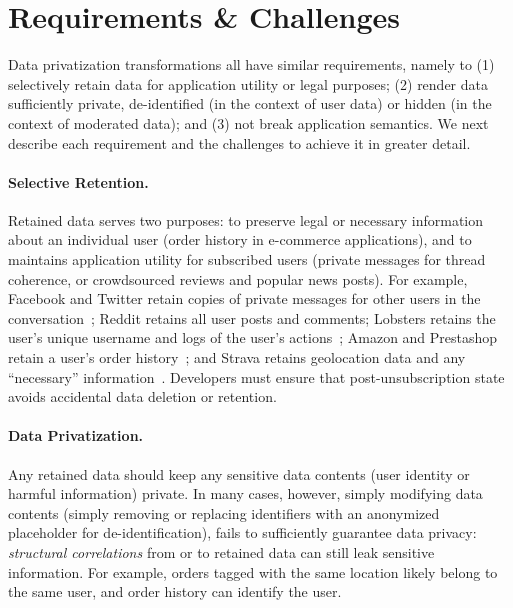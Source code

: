 \section{Requirements \& Challenges}

Data privatization transformations all have similar requirements, namely to (1) selectively
retain data for application utility or legal purposes; (2) render data sufficiently private, \ie
de-identified (in the context of user data) or hidden (in the context of moderated data); and (3)
not break application semantics. We next describe each requirement and the challenges to achieve it
in greater detail.

%

\paragraph{Selective Retention.}
Retained data serves two purposes: to preserve legal or necessary information about an individual
user (\eg order history in e-commerce applications), and to maintains application utility for
subscribed users (\eg private messages for thread coherence, or crowdsourced reviews and popular
news posts).  For example, Facebook and Twitter retain copies of private messages for other users in
the conversation~\cite{facebook:privacy, twitter:privacy}; Reddit retains all user posts and comments;
Lobsters retains the user's unique username and logs of the user's actions~\cite{reddit:privacy};
Amazon and Prestashop retain a user's order history~\cite{amazon:privacy, prestashop:privacy}; and
Strava retains geolocation data and any ``necessary'' information~\cite{strava:privacy}. 
Developers must ensure that post-unsubscription state avoids accidental data deletion or retention.

\paragraph{Data Privatization.}
Any retained data should keep any sensitive data contents (\eg user identity or harmful information)
private. In many cases, however, simply modifying data contents (\eg simply removing or replacing
identifiers with an anonymized placeholder for de-identification), fails to sufficiently guarantee
data privacy: \emph{structural correlations} from or to retained data can still leak sensitive
information. For example, orders tagged with the same location likely belong to the same user, and
order history can identify the user. 


